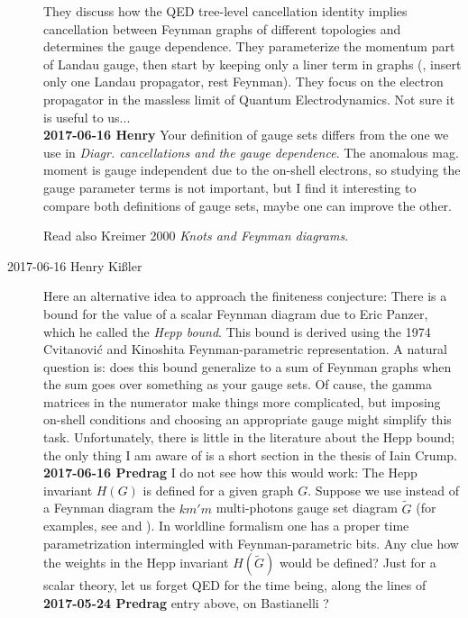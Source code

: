 \begin{description}
They discuss how the QED tree-level cancellation identity implies
cancellation between Feynman graphs of different topologies and
determines the gauge dependence. They parameterize the momentum part of
Landau gauge, then start by keeping only a liner term in graphs (\ie,
insert only one Landau propagator, rest Feynman).
They focus on the electron propagator in the massless limit of Quantum
Electrodynamics.
Not sure it is useful
to us...
\\{\bf 2017-06-16 Henry}
Your definition of gauge sets
differs from the one we use in {\em Diagr. cancellations and
the gauge dependence}. The anomalous mag. moment is gauge
independent due to the on-shell electrons, so studying the gauge
parameter terms is not important, but I find it interesting to compare
both definitions of gauge sets, maybe one can improve the other.

Read also Kreimer 2000
{\em Knots and {Feynman} diagrams}.

\item[2017-06-16 Henry Ki{\ss}ler]
 \label{sect:Hepp}
Here an alternative idea to approach the finiteness conjecture: There is
a bound for the value of a scalar Feynman diagram due to Eric Panzer,
which he called the \emph{Hepp bound}. This bound is derived using the 1974
Cvitanovi{\'c} and Kinoshita Feynman-parametric
representation. A natural question is: does this bound generalize to a
sum of Feynman graphs when the sum goes over something as your gauge
sets. Of cause, the gamma matrices in the numerator make things more
complicated, but imposing on-shell conditions and choosing an appropriate
gauge might simplify this task. Unfortunately, there is little in the
literature about the Hepp bound; the only thing I am aware
of is a short section in the
{thesis} of Iain Crump.
\\{\bf 2017-06-16 Predrag}
I do not see how this would work: The Hepp invariant $H(G)$ is defined
for a given graph $G$. Suppose we use instead of a Feynman diagram the
$km'm$ multi-photons gauge set diagram $\tilde{G}$ (for examples, see
 and ). In worldline formalism
one has a proper time parametrization intermingled with
Feynman-parametric bits. Any clue how the weights in the Hepp invariant
$H(\tilde{G})$ would be defined? Just for a scalar theory, let us forget QED
for the time being, along the lines of
{\bf 2017-05-24 Predrag} entry above, on Bastianelli \etal{}?


\end{description}
